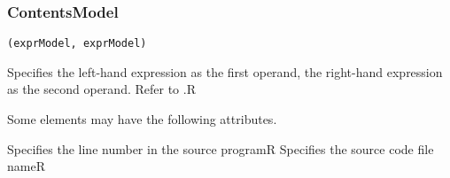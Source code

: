 \subsubsection*{ContentsModel}{}

\begin{lstlisting}[style=default,frame=none]
(exprModel, exprModel)
\end{lstlisting}

\begin{HIRChildElements}
	{Specifies the left-hand expression as the first operand, the right-hand 
	 expression as the second operand. Refer to .}{R}
\end{HIRChildElements}


Some elements may have the following attributes. 
\begin{HIRAttributes}
    {Specifies the line number in the source program}{R}
    {Specifies the source code file name}{R}
\end{HIRAttributes}

